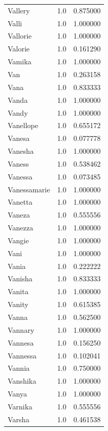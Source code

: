 \documentclass[
  letterpaper,
  DIV=11,
  numbers=noendperiod]{scrreprt}
\begin{document}
\begin{tabular}{lrr}
Vallery         &   1.0 &   0.875000 \\
Valli           &   1.0 &   1.000000 \\
Vallorie        &   1.0 &   1.000000 \\
Valorie         &   1.0 &   0.161290 \\
Vamika          &   1.0 &   1.000000 \\
Van             &   1.0 &   0.263158 \\
Vana            &   1.0 &   0.833333 \\
Vanda           &   1.0 &   1.000000 \\
Vandy           &   1.0 &   1.000000 \\
Vanellope       &   1.0 &   0.655172 \\
Vanesa          &   1.0 &   0.077778 \\
Vanesha         &   1.0 &   1.000000 \\
Vaness          &   1.0 &   0.538462 \\
Vanessa         &   1.0 &   0.073485 \\
Vanessamarie    &   1.0 &   1.000000 \\
Vanetta         &   1.0 &   1.000000 \\
Vaneza          &   1.0 &   0.555556 \\
Vanezza         &   1.0 &   1.000000 \\
Vangie          &   1.0 &   1.000000 \\
Vani            &   1.0 &   1.000000 \\
Vania           &   1.0 &   0.222222 \\
Vanisha         &   1.0 &   0.833333 \\
Vanita          &   1.0 &   1.000000 \\
Vanity          &   1.0 &   0.615385 \\
Vanna           &   1.0 &   0.562500 \\
Vannary         &   1.0 &   1.000000 \\
Vannesa         &   1.0 &   0.156250 \\
Vannessa        &   1.0 &   0.102041 \\
Vannia          &   1.0 &   0.750000 \\
Vanshika        &   1.0 &   1.000000 \\
Vanya           &   1.0 &   1.000000 \\
Varnika         &   1.0 &   0.555556 \\
Varsha          &   1.0 &   0.461538 \\

\end{tabular}
\end{document}
